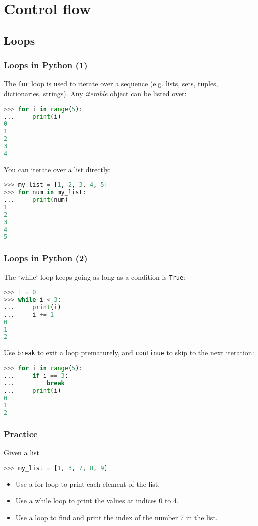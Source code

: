  \section{Control flow}
 \subsection{Loops}
 
\begin{frame}[fragile]
  \frametitle{Loops in Python (1)}
  The \lstinline$for$ loop is used to iterate over a sequence (e.g. lists, sets, tuples, dictionaries, strings). Any \emph{iterable} object can be listed over:
  \begin{lstlisting}[language=Python,numbers=none]
>>> for i in range(5):
...     print(i)
0
1
2
3
4
  \end{lstlisting}\pause
  You can iterate over a list directly:
  \begin{lstlisting}[language=Python,numbers=none]
>>> my_list = [1, 2, 3, 4, 5]
>>> for num in my_list:
...     print(num)
1
2
3
4
5
  \end{lstlisting}
\end{frame}

\begin{frame}[fragile]
  \frametitle{Loops in Python (2)}
  The `while` loop keeps going as long as a condition is \lstinline{True}:
  \begin{lstlisting}[language=Python,numbers=none]
>>> i = 0
>>> while i < 3:
...     print(i)
...     i += 1
0
1
2
  \end{lstlisting}\pause
  Use \lstinline|break| to exit a loop prematurely, and \lstinline|continue| to skip to the next iteration:
  \begin{lstlisting}[language=Python,numbers=none]
>>> for i in range(5):
...     if i == 3:
...         break
...     print(i)
0
1
2
  \end{lstlisting}
\end{frame}

\begin{frame}[fragile]
  \frametitle{Practice}
  Given a list
  \begin{lstlisting}[language=Python,numbers=none]
>>> my_list = [1, 3, 7, 8, 9] 
  \end{lstlisting}
 
 \begin{itemize}
  \item Use a for loop to print each element of the list.\pause
  \item Use a while loop to print the values at indices 0 to 4.\pause
  \item Use a loop to find and print the index of the number 7 in the list.
 \end{itemize}
\end{frame}

